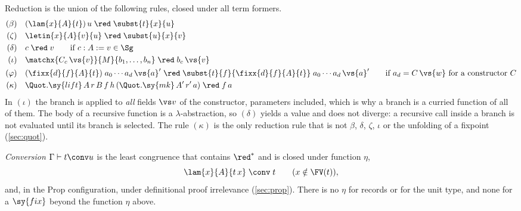 Reduction is the union of the following rules, closed under all term formers.
\begin{align*}
(\beta)\quad & (\lam{x}{A}{t})\,u \;\red\; \subst{t}{x}{u}\\
(\zeta)\quad & \letin{x}{A}{v}{u} \;\red\; \subst{u}{x}{v}\\
(\delta)\quad & c \;\red\; v \qquad\text{if } c : A \mathrel{:=} v \in \Sg\\
(\iota)\quad & \matchx{C_c\,\vs{v}}{M}{b_1,\dots,b_n} \;\red\; b_c\,\vs{v}\\
(\varphi)\quad & (\fixx{d}{f}{A}{t})\;a_0 \cdots a_d\,\vs{a}' \;\red\; \subst{t}{f}{\fixx{d}{f}{A}{t}}\;a_0\cdots a_d\,\vs{a}'
   \qquad\text{if } a_d = C\,\vs{w}\text{ for a constructor }C\\
(\kappa)\quad & \Quot.\sy{lift}\,A\,r\,B\,f\,h\,(\Quot.\sy{mk}\,A'\,r'\,a) \;\red\; f\,a
\end{align*}
In $(\iota)$ the branch is applied to \emph{all} fields $\vs v$ of the constructor, parameters included, which is why a branch is a curried function of all of them.
The body of a recursive function is a $\lambda$-abstraction, so $(\delta)$ yields a value and does not diverge: a recursive call inside a branch is not evaluated until its branch is selected.
The rule $(\kappa)$ is the only reduction rule that is not $\beta$, $\delta$, $\zeta$, $\iota$ or the unfolding of a fixpoint (\cref{sec:quot}).

\emph{Conversion} $\Gamma \vdash t \conv u$ is the least congruence that contains $\red^*$ and is closed under function $\eta$,
\[
\lam{x}{A}{t\,x} \;\conv\; t\qquad (x\notin\FV(t)),
\]
and, in the Prop configuration, under definitional proof irrelevance (\cref{sec:prop}).
There is no $\eta$ for records or for the unit type, and none for a $\sy{fix}$ beyond the function $\eta$ above.

